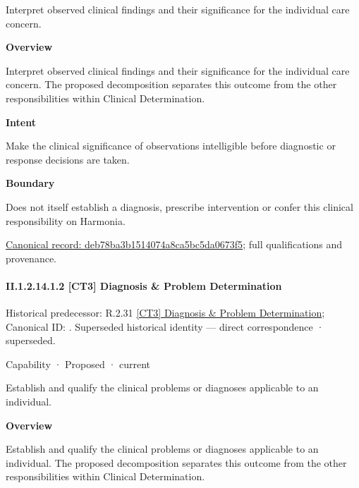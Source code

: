 Interpret observed clinical findings and their significance for the individual care concern.



\textbf{Overview}



Interpret observed clinical findings and their significance for the individual care concern. The proposed decomposition separates this outcome from the other responsibilities within Clinical Determination.



\textbf{Intent}



Make the clinical significance of observations intelligible before diagnostic or response decisions are taken.



\textbf{Boundary}



Does not itself establish a diagnosis, prescribe intervention or confer this clinical responsibility on Harmonia.


{\footnotesize \href{../../../../../../../continuum/strategy/capability/deb78ba3b1514074a8ca5bc5da0673f5.md}{Canonical record: deb78ba3b1514074a8ca5bc5da0673f5}; full qualifications and provenance.}\par
\paragraph*{II.1.2.14.1.2 [CT3] Diagnosis \& Problem Determination}
\label{navigation:II.1.2.14.1.2}

{\small Historical predecessor: R.2.31 \hyperref[element:e575c583783546ef85cf898523d18797]{[CT3] Diagnosis \& Problem Determination}; Canonical ID: \texttt{}. Superseded historical identity — direct correspondence · superseded.}\par
\label{element:d965032637e64275b7a61c0413834590}
{\small Capability · Proposed · current}\par

Establish and qualify the clinical problems or diagnoses applicable to an individual.



\textbf{Overview}



Establish and qualify the clinical problems or diagnoses applicable to an individual. The proposed decomposition separates this outcome from the other responsibilities within Clinical Determination.



